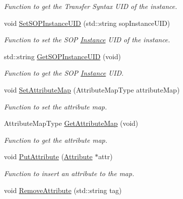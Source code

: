 \begin{DoxyCompactItemize}
\begin{DoxyCompactList}\small\item\em Function to get the Transfer Syntax UID of the instance. \item\end{DoxyCompactList}\item 
void \hyperlink{class_instance_a4b780d68dcd3aa84942b1e992d099824}{SetSOPInstanceUID} (std::string sopInstanceUID)
\begin{DoxyCompactList}\small\item\em Function to set the SOP \hyperlink{class_instance}{Instance} UID of the instance. \item\end{DoxyCompactList}\item 
std::string \hyperlink{class_instance_a35a9cd8b48d2eba38700b321a51ed12f}{GetSOPInstanceUID} (void)
\begin{DoxyCompactList}\small\item\em Function to get the SOP \hyperlink{class_instance}{Instance} UID. \item\end{DoxyCompactList}\item 
void \hyperlink{class_instance_ad97f3face6817278f20fbed72c93d5b2}{SetAttributeMap} (AttributeMapType attributeMap)
\begin{DoxyCompactList}\small\item\em Function to set the attribute map. \item\end{DoxyCompactList}\item 
AttributeMapType \hyperlink{class_instance_ab9785ffebb086e9b928bebf58151d1c1}{GetAttributeMap} (void)
\begin{DoxyCompactList}\small\item\em Function to get the attribute map. \item\end{DoxyCompactList}\item 
void \hyperlink{class_instance_a6ddc309cf7037f08336db5e2964f3566}{PutAttribute} (\hyperlink{class_attribute}{Attribute} $\ast$attr)
\begin{DoxyCompactList}\small\item\em Function to insert an attribute to the map. \item\end{DoxyCompactList}\item 
void \hyperlink{class_instance_a465d0b6377061587052fa2445707308c}{RemoveAttribute} (std::string tag)

\end{DoxyCompactItemize}
